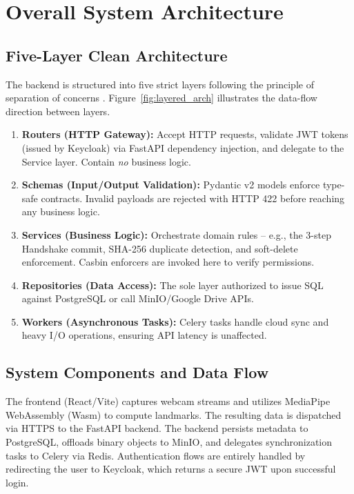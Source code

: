 \section{Overall System Architecture}

\subsection{Five-Layer Clean Architecture}
The backend is structured into five strict layers following the principle of separation of concerns \cite{dijkstra1982role}. Figure~\ref{fig:layered_arch} illustrates the data-flow direction between layers.


\begin{enumerate}
    \item \textbf{Routers (HTTP Gateway):} Accept HTTP requests, validate JWT tokens (issued by Keycloak) via FastAPI dependency injection, and delegate to the Service layer. Contain \textit{no} business logic.
    \item \textbf{Schemas (Input/Output Validation):} Pydantic v2 models enforce type-safe contracts. Invalid payloads are rejected with HTTP 422 before reaching any business logic.
    \item \textbf{Services (Business Logic):} Orchestrate domain rules -- e.g., the 3-step Handshake commit, SHA-256 duplicate detection, and soft-delete enforcement. Casbin enforcers are invoked here to verify permissions.
    \item \textbf{Repositories (Data Access):} The sole layer authorized to issue SQL against PostgreSQL or call MinIO/Google Drive APIs.
    \item \textbf{Workers (Asynchronous Tasks):} Celery tasks handle cloud sync and heavy I/O operations, ensuring API latency is unaffected.
\end{enumerate}

\subsection{System Components and Data Flow}
The frontend (React/Vite) captures webcam streams and utilizes MediaPipe WebAssembly (Wasm) to compute landmarks. The resulting data is dispatched via HTTPS to the FastAPI backend. The backend persists metadata to PostgreSQL, offloads binary objects to MinIO, and delegates synchronization tasks to Celery via Redis. Authentication flows are entirely handled by redirecting the user to Keycloak, which returns a secure JWT upon successful login.

